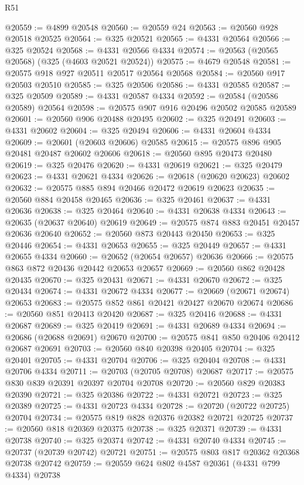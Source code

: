 \begin{lexlean}{R51}
\begin{coremodule}
@20559 := @4899 @20548
@20560 := @20559 @24
@20563 := @20560 @928 @20518 @20525
@20564 := @325 @20521
@20565 := @4331 @20564
@20566 := @325 @20524
@20568 := @4331 @20566 @4334
@20574 := @20563 (@20565 @20568) (@325 (@4603 @20521 @20524))
@20575 := @4679 @20548
@20581 := @20575 @918 @927 @20511 @20517 @20564 @20568
@20584 := @20560 @917 @20503 @20510
@20585 := @325 @20506
@20586 := @4331 @20585
@20587 := @325 @20509
@20589 := @4331 @20587 @4334
@20592 := @20584 (@20586 @20589) @20564
@20598 := @20575 @907 @916 @20496 @20502 @20585 @20589
@20601 := @20560 @906 @20488 @20495
@20602 := @325 @20491
@20603 := @4331 @20602
@20604 := @325 @20494
@20606 := @4331 @20604 @4334
@20609 := @20601 (@20603 @20606) @20585
@20615 := @20575 @896 @905 @20481 @20487 @20602 @20606
@20618 := @20560 @895 @20473 @20480
@20619 := @325 @20476
@20620 := @4331 @20619
@20621 := @325 @20479
@20623 := @4331 @20621 @4334
@20626 := @20618 (@20620 @20623) @20602
@20632 := @20575 @885 @894 @20466 @20472 @20619 @20623
@20635 := @20560 @884 @20458 @20465
@20636 := @325 @20461
@20637 := @4331 @20636
@20638 := @325 @20464
@20640 := @4331 @20638 @4334
@20643 := @20635 (@20637 @20640) @20619
@20649 := @20575 @874 @883 @20451 @20457 @20636 @20640
@20652 := @20560 @873 @20443 @20450
@20653 := @325 @20446
@20654 := @4331 @20653
@20655 := @325 @20449
@20657 := @4331 @20655 @4334
@20660 := @20652 (@20654 @20657) @20636
@20666 := @20575 @863 @872 @20436 @20442 @20653 @20657
@20669 := @20560 @862 @20428 @20435
@20670 := @325 @20431
@20671 := @4331 @20670
@20672 := @325 @20434
@20674 := @4331 @20672 @4334
@20677 := @20669 (@20671 @20674) @20653
@20683 := @20575 @852 @861 @20421 @20427 @20670 @20674
@20686 := @20560 @851 @20413 @20420
@20687 := @325 @20416
@20688 := @4331 @20687
@20689 := @325 @20419
@20691 := @4331 @20689 @4334
@20694 := @20686 (@20688 @20691) @20670
@20700 := @20575 @841 @850 @20406 @20412 @20687 @20691
@20703 := @20560 @840 @20398 @20405
@20704 := @325 @20401
@20705 := @4331 @20704
@20706 := @325 @20404
@20708 := @4331 @20706 @4334
@20711 := @20703 (@20705 @20708) @20687
@20717 := @20575 @830 @839 @20391 @20397 @20704 @20708
@20720 := @20560 @829 @20383 @20390
@20721 := @325 @20386
@20722 := @4331 @20721
@20723 := @325 @20389
@20725 := @4331 @20723 @4334
@20728 := @20720 (@20722 @20725) @20704
@20734 := @20575 @819 @828 @20376 @20382 @20721 @20725
@20737 := @20560 @818 @20369 @20375
@20738 := @325 @20371
@20739 := @4331 @20738
@20740 := @325 @20374
@20742 := @4331 @20740 @4334
@20745 := @20737 (@20739 @20742) @20721
@20751 := @20575 @803 @817 @20362 @20368 @20738 @20742
@20759 := @20559 @624 @802 @4587 @20361 (@4331 @799 @4334) @20738

\end{coremodule}
\end{lexlean}
